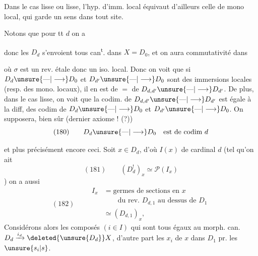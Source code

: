 Dans le cas lisse ou  lisse, l'hyp. d'imm. local équivaut d'ailleurs  celle de mono local, qui garde un sens dans tout site.

Notons que pour tt $d$ on a

donc les $D_d$ s'envoient tous can\textsuperscript{t}. dans $X=D_0$, et on aura commutativité dans


où $\sigma$ est un rev. étale donc un iso. local. Donc on voit que si $D_d\unsure{\text{---}|\longrightarrow}D_0$ et $D_{d'}\unsure{\text{---}|\longrightarrow}D_0$ sont des immersions locales (resp. des mono. locaux), il en est de $=$ de $D_{d,d'}\unsure{\text{---}|\longrightarrow}D_{d'}$. De plus, dans le cas lisse, on voit que la codim. de $D_{d,d'}\unsure{\text{---}|\longrightarrow}D_{d'}$ est égale à la diff, des codim de $D_d\unsure{\text{---}|\longrightarrow}D_0$ et $D_{d'}\unsure{\text{---}|\longrightarrow}D_0$. On supposera, bien sûr (dernier axiome ! (?))
\[
(180)\qquad D_d\unsure{\text{---}|\longrightarrow}D_0\quad\text{est de codim }d
\]

 et plus précisément encore ceci. Soit  $x\in D_d$, d'où $I(x)$ de cardinal $d$ (tel qu'on ait
\[
(181)\qquad(D_d^!)_x\simeq\mathcal P(I_x)
\]
)
  on a aussi
\[
(182)\qquad\begin{aligned}
I_x&=\text{germes de sections en }x\\
&\qquad\text{du rev. }D_{d,1}\text{ au dessus de }D_1\\
&\simeq(D_{d,1})_x,
\end{aligned}
\]
Considérons alors les composés $(i\in I)$
qui sont tous égaux au morph. can. $D_d\xrightarrow{i_d}\deleted{\unsure{D_d}}X$, d'autre part les   $x_i$ de $x$ dans $D_1$ pr. les $\unsure{s_i|s}$.

